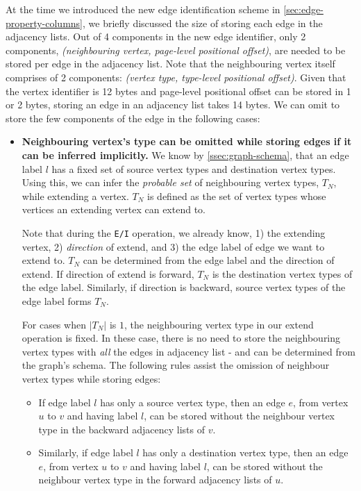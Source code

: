At the time we introduced the new edge identification scheme in \ref{sec:edge-property-columns}, we briefly discussed the size of storing each edge in the adjacency lists. Out of 4 components in the new edge identifier, only 2 components, \emph{(neighbouring vertex, page-level positional offset)}, are needed to be stored per edge in the adjacency list. Note that the neighbouring vertex itself comprises of 2 components: \emph{(vertex type, type-level positional offset)}. Given that the vertex identifier is 12 bytes and page-level positional offset can be stored in 1 or 2 bytes, storing an edge in an adjacency list takes 14 bytes. We can omit to store the few components of the edge in the following cases: 

\begin{itemize}
	\item \textbf{Neighbouring vertex's type can be omitted while storing edges if it can be inferred implicitly.} We know by \ref{ssec:graph-schema}, that an edge label $l$ has a fixed set of source vertex types and destination vertex types. Using this, we can infer the \emph{probable set} of neighbouring vertex types, $T_N$, while extending a vertex. $T_N$ is defined as the set of vertex types whose vertices an extending vertex can extend to.

	Note that during the \texttt{E/I} operation, we already know, 1) the extending vertex, 2) \emph{direction} of extend, and 3) the edge label of edge we want to extend to. $T_N$ can be determined from the edge label and the direction of extend. If direction of extend is forward, $T_N$ is the destination vertex types of the edge label. Similarly, if direction is backward, source vertex types of the edge label forms $T_N$. 
	
	For cases when $|T_N|$ is $1$, the neighbouring vertex type in our extend operation is fixed. In these case, there is no need to store the neighbouring vertex types with \emph{all} the edges in adjacency list - and can be determined from the graph's schema. The following rules assist the omission of neighbour vertex types while storing edges:
	
	\begin{itemize}
		\item If edge label $l$ has only a source vertex type, then an edge $e$, from vertex $u$ to $v$ and having label $l$, can be stored without the neighbour vertex type in the backward adjacency lists of $v$.
		
		\item Similarly, if edge label $l$ has only a destination vertex type, then an edge $e$, from vertex $u$ to $v$ and having label $l$, can be stored without the neighbour vertex type in the forward adjacency lists of $u$.
	\end{itemize}


\end{itemize}
